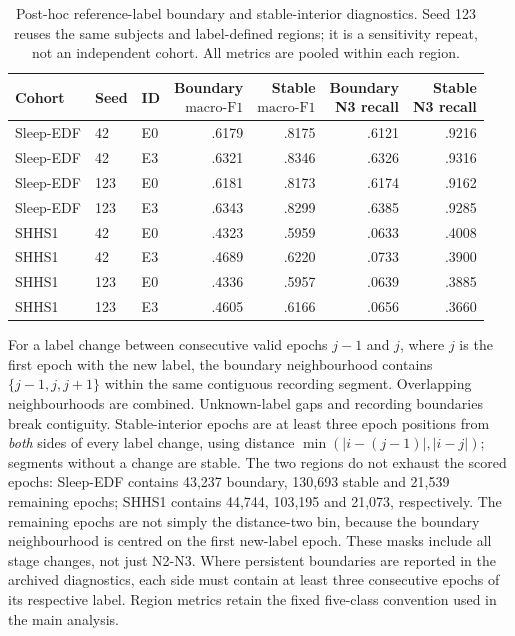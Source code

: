 \documentclass[10pt,a4paper]{article}
\newcommand{\mf}{\ensuremath{\mathrm{macro\text{-}F1}}}
\begin{document}
\begin{table}[H]
\centering\small
\caption{Post-hoc reference-label boundary and stable-interior diagnostics.
Seed 123 reuses the same subjects and label-defined regions; it is a sensitivity repeat, not
an independent cohort. All metrics are pooled within each region.}
\label{tab:sup_boundary}
\begin{tabular}{lllrrrr}
\toprule
Cohort & Seed & ID & \shortstack{Boundary\\\mf} & \shortstack{Stable\\\mf} &
\shortstack{Boundary\\N3 recall} & \shortstack{Stable\\N3 recall} \\
\midrule
Sleep-EDF & 42 & E0 & .6179 & .8175 & .6121 & .9216 \\
Sleep-EDF & 42 & E3 & .6321 & .8346 & .6326 & .9316 \\
Sleep-EDF & 123 & E0 & .6181 & .8173 & .6174 & .9162 \\
Sleep-EDF & 123 & E3 & .6343 & .8299 & .6385 & .9285 \\
\addlinespace
SHHS1 & 42 & E0 & .4323 & .5959 & .0633 & .4008 \\
SHHS1 & 42 & E3 & .4689 & .6220 & .0733 & .3900 \\
SHHS1 & 123 & E0 & .4336 & .5957 & .0639 & .3885 \\
SHHS1 & 123 & E3 & .4605 & .6166 & .0656 & .3660 \\
\bottomrule
\end{tabular}
\end{table}

For a label change between consecutive valid epochs $j-1$ and $j$, where $j$ is the first epoch
with the new label, the boundary neighbourhood contains $\{j-1,j,j+1\}$ within the same contiguous
recording segment. Overlapping neighbourhoods are combined. Unknown-label gaps and recording
boundaries break contiguity. Stable-interior epochs are at least three epoch positions from
\emph{both} sides of every label change, using distance
$\min(|i-(j-1)|,|i-j|)$; segments without a change are stable. The two regions do not exhaust the
scored epochs: Sleep-EDF contains 43,237 boundary, 130,693 stable and 21,539 remaining epochs;
SHHS1 contains 44,744, 103,195 and 21,073, respectively. The remaining epochs are not simply the
distance-two bin, because the boundary neighbourhood is centred on the first new-label epoch.
These masks include all stage changes, not just N2-N3. Where persistent boundaries are reported
in the archived diagnostics, each side must contain at least three consecutive epochs of its
respective label. Region metrics retain the fixed five-class convention used in the main analysis.
\end{document}
